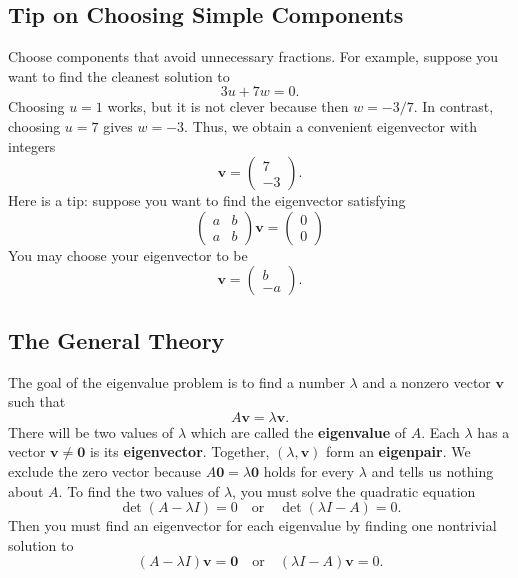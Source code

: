 \documentclass[10pt,letterpaper]{article}
\begin{document}
\subsection{Tip on Choosing Simple Components}

Choose components that avoid unnecessary fractions.
For example, suppose you want to find the cleanest solution to 
\[
3u+7w=0.
\]
Choosing $u=1$ works, but it is not clever because then $w=-3/7$. In contrast, 
choosing $u=7$ gives $w=-3$. Thus, we obtain a convenient 
eigenvector with integers
\[
\mathbf{v}=\begin{pmatrix}7\\-3\end{pmatrix}.
\]
Here is a tip: suppose you want to find the eigenvector satisfying 
\[
\begin{pmatrix}
    a & b\\
    a & b
\end{pmatrix} \textbf{v} = \begin{pmatrix}
    0\\0
\end{pmatrix}
\]
You may choose your eigenvector to be 
\[
\boxed{\mathbf{v}=\begin{pmatrix}b\\-a\end{pmatrix}.}
\]

\subsection{The General Theory}

The goal of the eigenvalue problem is to find a number $\lambda$ and a
nonzero vector $\mathbf{v}$ such that
\[
A\mathbf{v}=\lambda\mathbf{v}.
\]
There will be two values  of $\lambda$ which are called the \textbf{eigenvalue} of $A$. Each $\lambda$ has a vector $\mathbf{v}\ne\mathbf{0}$ is its \textbf{eigenvector}. Together, $(\lambda,\mathbf{v})$ form an \textbf{eigenpair}.
We exclude the zero vector because $A\mathbf{0}=\lambda\mathbf{0}$ holds for every
$\lambda$ and tells us nothing about $A$. To find the two values of $\lambda$, you must solve the quadratic equation
$$
    \det(A-\lambda I)=0 \quad \text{or} \quad \det(\lambda I-A)=0.
$$
Then you must find an eigenvector for each eigenvalue by finding one nontrivial solution to 
$$
    (A-\lambda I)\textbf{v}=\textbf{0} \quad \text{or} \quad (\lambda I-A) \textbf{v}=0.
$$

\end{document}
